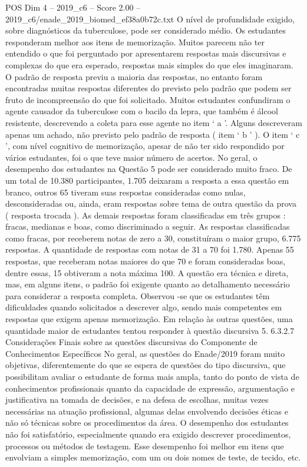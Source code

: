 \begin{textsample}{POS Dim 4 – 2019\_c6 – Score 2.00 – 2019\_c6/enade\_2019\_biomed\_ef38a0b72c.txt}
O nível de profundidade exigido, sobre diagnósticos da tuberculose, pode ser considerado médio.
Os estudantes responderam melhor aos itens de memorização.
Muitos parecem não ter entendido o que foi perguntado por apresentarem respostas mais discursivas e complexas do que era esperado, respostas mais simples do que eles imaginaram.
O padrão de resposta previu a maioria das respostas, no entanto foram encontradas muitas respostas diferentes do previsto pelo padrão que podem ser fruto de incompreensão do que foi solicitado.
Muitos estudantes confundiram o agente causador da tuberculose com o bacilo da lepra, que também é álcool resistente, descrevendo a coleta para esse agente no item ‘ a ’.
Alguns descreveram apenas um achado, não previsto pelo padrão de resposta ( item ‘ b ’ ).
O item ‘ c ’, com nível cognitivo de memorização, apesar de não ter sido respondido por vários estudantes, foi o que teve maior número de acertos.
No geral, o desempenho dos estudantes na Questão 5 pode ser considerado muito fraco.
De um total de 10.380 participantes, 1.705 deixaram a resposta a essa questão em branco, outros 65 tiveram suas respostas consideradas como nulas, desconsideradas ou, ainda, eram respostas sobre tema de outra questão da prova ( resposta trocada ).
As demais respostas foram classificadas em três grupos : fracas, medianas e boas, como discriminado a seguir.
As respostas classificadas como fracas, por receberem notas de zero a 30, constituíram o maior grupo, 6.775 respostas.
A quantidade de respostas com notas de 31 a 70 foi 1.780.
Apenas 55 respostas, que receberam notas maiores do que 70 e foram consideradas boas, dentre essas, 15 obtiveram a nota máxima 100.
A questão era técnica e direta, mas, em alguns itens, o padrão foi exigente quanto ao detalhamento necessário para considerar a resposta completa.
Observou -se que os estudantes têm dificuldades quando solicitados a descrever algo, sendo mais competentes em respostas que exigem apenas memorização.
Em relação às outras questões, uma quantidade maior de estudantes tentou responder à questão discursiva 5. 6.3.2.7 Considerações Finais sobre as questões discursivas do Componente de Conhecimentos Específicos No geral, as questões do Enade/2019 foram muito objetivas, diferentemente do que se espera de questões do tipo discursiva, que possibilitam avaliar o estudante de forma mais ampla, tanto do ponto de vista de conhecimentos profissionais quanto da capacidade de expressão, argumentação e justificativa na tomada de decisões, e na defesa de escolhas, muitas vezes necessárias na atuação profissional, algumas delas envolvendo decisões éticas e não só técnicas sobre os procedimentos da área.
O desempenho dos estudantes não foi satisfatório, especialmente quando era exigido descrever procedimentos, processos ou métodos de testagem.
Esse desempenho foi melhor em itens que envolviam a simples memorização, com um ou dois nomes de teste, de tecido, etc.

\end{textsample}

